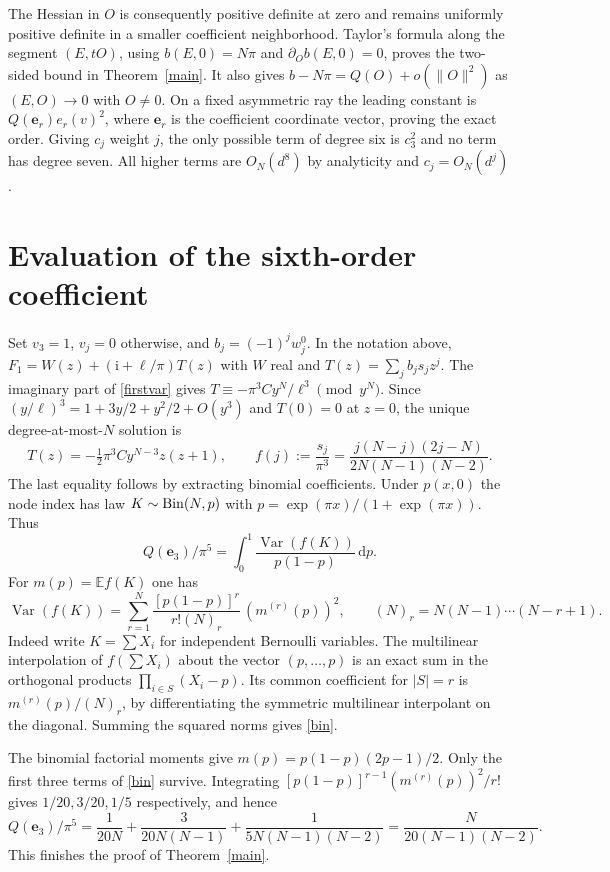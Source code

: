 \documentclass[11pt]{article}
\newcommand{\dd}{\mathrm d}
\newcommand{\ii}{\mathrm i}
\begin{document}
The Hessian in $O$ is consequently positive definite at zero and remains
uniformly positive definite in a smaller coefficient neighborhood.
Taylor's formula along the segment $(E,tO)$, using $b(E,0)=N\pi$ and
$\partial_O b(E,0)=0$, proves the two-sided bound in Theorem~\ref{main}.
It also gives $b-N\pi=Q(O)+o(\|O\|^2)$ as $(E,O)\to0$ with $O\ne0$.
On a fixed asymmetric ray the leading constant is
$Q(\mathbf e_r)e_r(v)^2$, where $\mathbf e_r$ is the coefficient coordinate
vector, proving the exact order. Giving $c_j$ weight $j$, the only possible
term of degree six is $c_3^2$ and no term has degree seven. All higher
terms are $O_N(d^8)$ by analyticity and $c_j=O_N(d^j)$.

\section{Evaluation of the sixth-order coefficient}
Set $v_3=1$, $v_j=0$ otherwise, and $b_j=(-1)^jw_j^0$. In the notation
above, $F_1=W(z)+(\ii+\ell/\pi)T(z)$ with $W$ real and
$T(z)=\sum_j b_j s_jz^j$. The imaginary part of \eqref{firstvar}
gives $T\equiv-\pi^3 C y^N/\ell^3\pmod{y^N}$.
Since $(y/\ell)^3=1+3y/2+y^2/2+O(y^3)$ and $T(0)=0$ at $z=0$,
the unique degree-at-most-$N$ solution is
\[
 T(z)=-\tfrac12\pi^3 C y^{N-3}z(z+1),\qquad
 f(j):=\frac{s_j}{\pi^3}
   =\frac{j(N-j)(2j-N)}{2N(N-1)(N-2)} .
\]
The last equality follows by extracting binomial coefficients.
Under $p(x,0)$ the node index has law $K\sim{\rm Bin}(N,p)$ with
$p=\exp(\pi x)/(1+\exp(\pi x))$. Thus
\[
 Q(\mathbf e_3)/\pi^5=\int_0^1\frac{\operatorname{Var}(f(K))}{p(1-p)}\,\dd p .
\]
For $m(p)=\mathbb E f(K)$ one has
\begin{equation}\label{bin}
 \operatorname{Var}(f(K))=
 \sum_{r=1}^N\frac{[p(1-p)]^r}{r!(N)_r}\,(m^{(r)}(p))^2,
 \qquad (N)_r=N(N-1)\cdots(N-r+1).
\end{equation}
Indeed write $K=\sum X_i$ for independent Bernoulli variables.
The multilinear interpolation of $f(\sum X_i)$ about the vector
$(p,\dots,p)$ is an exact sum in the orthogonal products
$\prod_{i\in S}(X_i-p)$. Its common coefficient for $|S|=r$ is
$m^{(r)}(p)/(N)_r$, by differentiating the symmetric multilinear
interpolant on the diagonal. Summing the squared norms gives \eqref{bin}.

The binomial factorial moments give $m(p)=p(1-p)(2p-1)/2$.
Only the first three terms of \eqref{bin} survive. Integrating
$[p(1-p)]^{r-1}(m^{(r)}(p))^2/r!$ gives $1/20,3/20,1/5$ respectively,
and hence
\[
 Q(\mathbf e_3)/\pi^5=
 \frac{1}{20N}+\frac{3}{20N(N-1)}
 +\frac{1}{5N(N-1)(N-2)}
 =\frac{N}{20(N-1)(N-2)}.
\]
This finishes the proof of Theorem~\ref{main}.
\end{document}
